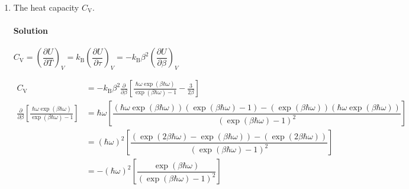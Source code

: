 \documentclass{article}
\begin{document}
\begin{enumerate}
		\begin{equation}
			\begin{split}
				\ln Z &= \ln\left( V\dfrac{\sqrt{2\pi m}}{h\epsilon_0} \right) + \ln\left( \frac{\exp(-\beta\hbar\omega/2)}{1 - \exp(\beta\hbar\omega)} \right) + \ln\left( \frac{1}{\beta^{3/2}} \right) \\
				\ln\left( \frac{\exp(-\beta\hbar\omega/2)}{1 - \exp(\beta\hbar\omega)} \right) &= -\beta\hbar\omega/2 - \ln(1 - \exp(\beta\hbar\omega))
			\end{split}
		\end{equation}
		
		\begin{equation}
			\begin{split}
				U &= \frac{\partial}{\partial \beta} \left[ \frac{\beta\hbar\omega}{2} + \ln(1 - \exp(\beta\hbar\omega)) - \ln\left( \frac{1}{\beta^{3/2}} \right) \right] \\
				  &= \frac{\hbar\omega}{2} + \frac{-\hbar\omega\exp(\beta\hbar\omega)}{1 - \exp(\beta\hbar\omega)} - \frac{\frac{3}{2}\beta^{1/2}}{\beta^{3/2}} \\
				  \Aboxed{U &= \frac{\hbar\omega}{2} + \frac{\hbar\omega\exp(\beta\hbar\omega)}{\exp(\beta\hbar\omega) - 1} - \frac{3}{2\beta}}
			\end{split}
		\end{equation}
		
		
		\item[(c)] The heat capacity $C_\mathrm{V}$.
		\paragraph{Solution} $C_\mathrm{V} = \left( \dfrac{\partial U}{\partial T} \right)_V = k_\mathrm{B} \left( \dfrac{\partial U}{\partial \tau} \right)_V = -k_\mathrm{B} \beta^2 \left( \dfrac{\partial U}{\partial \beta} \right)_V $
		
		\begin{equation}
			\begin{split}
				C_\mathrm{V} &= -k_\mathrm{B} \beta^2 \frac{\partial}{\partial \beta} \left[ \frac{\hbar\omega\exp(\beta\hbar\omega)}{\exp(\beta\hbar\omega) - 1} - \frac{3}{2\beta} \right] \\
				\frac{\partial}{\partial \beta} \left[ \frac{\hbar\omega\exp(\beta\hbar\omega)}{\exp(\beta\hbar\omega) - 1} \right] &=  \hbar \omega \left[ \dfrac{\left( \hbar\omega \exp(\beta\hbar\omega) \right)\left( \exp(\beta\hbar\omega) - 1 \right) - \left( \exp(\beta\hbar\omega) \right)\left( \hbar\omega \exp(\beta\hbar\omega) \right)}{(\exp(\beta\hbar\omega) - 1)^2} \right] \\
				&= (\hbar \omega)^2 \left[ \dfrac{\left( \exp(2\beta\hbar\omega) - \exp(\beta\hbar\omega) \right) - \left( \exp(2\beta\hbar\omega) \right)}{(\exp(\beta\hbar\omega) - 1)^2} \right] \\
				&= -(\hbar \omega)^2 \left[ \dfrac{ \exp(\beta\hbar\omega) }{(\exp(\beta\hbar\omega) - 1)^2} \right] \\
			\end{split}
		\end{equation}
		

\end{enumerate}
\end{document}
